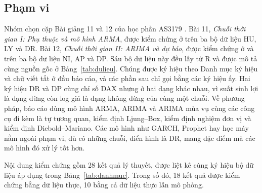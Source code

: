 \subsection{Phạm vi}
Nhóm chọn cặp Bài giảng 11 và 12 của học phần AS3179 . Bài 11, \textit{Chuỗi thời gian I: Phụ thuộc và mô hình ARMA}, được kiểm chứng ở  trên ba bộ dữ liệu HU, LY và DR. Bài 12, \textit{Chuỗi thời gian II: ARIMA và dự báo}, được kiểm chứng ở  và  trên ba bộ dữ liệu NI, AP và DP. Sáu bộ dữ liệu này đều lấy từ R và được mô tả cùng nguồn gốc ở Bảng~\ref{tab:dulieu}. Chúng được ký hiệu theo Danh mục ký hiệu và chữ viết tắt ở đầu báo cáo, và các phần sau chỉ gọi bằng các ký hiệu ấy. Hai ký hiệu DR và DP cùng chỉ số DAX nhưng ở hai dạng khác nhau, vì suất sinh lợi là dạng dừng còn log giá là dạng không dừng của cùng một chuỗi.
Về phương pháp, báo cáo dùng mô hình ARMA, ARIMA và ARIMA mùa vụ cùng các công cụ đi kèm là tự tương quan, kiểm định Ljung--Box, kiểm định nghiệm đơn vị và kiểm định Diebold--Mariano. Các mô hình như GARCH, Prophet hay học máy nằm ngoài phạm vi, dù có những chuỗi, điển hình là DR, mang đặc điểm mà các mô hình đó xử lý tốt hơn.

Nội dung kiểm chứng gồm 28 kết quả lý thuyết, được liệt kê cùng ký hiệu bộ dữ liệu áp dụng trong Bảng~\ref{tab:danhmuc}. Trong số đó, 18 kết quả được kiểm chứng bằng dữ liệu thực, 10 bằng cả dữ liệu thực lẫn mô phỏng.

